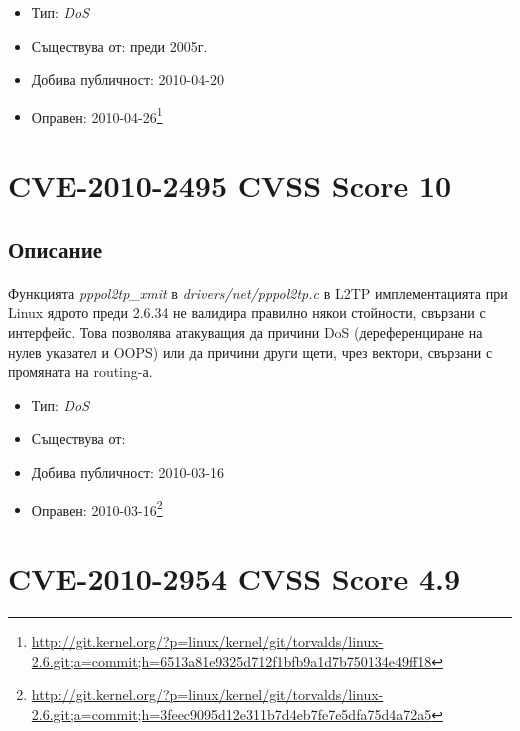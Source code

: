\documentclass[a4paper,12pt,leqno]{article}
\begin{document}
\begin{itemize}
    \item Тип: \textit{DoS}
    \item Съществува от: преди 2005г.
  	\item Добива публичност: 2010-04-20
    \item Оправен: 2010-04-26\footnote{\url{http://git.kernel.org/?p=linux/kernel/git/torvalds/linux-2.6.git;a=commit;h=6513a81e9325d712f1bfb9a1d7b750134e49ff18}}
\end{itemize}


\section{CVE-2010-2495 CVSS Score 10}
\subsection{Описание}
\paragraph{}

Функцията \textit{pppol2tp\_xmit} в \textit{drivers/net/pppol2tp.c} в L2TP имплементацията при Linux ядрото преди 2.6.34 не валидира правилно някои стойности, свързани с интерфейс. Това позволява атакуващия да причини DoS (дереференциране на нулев указател и OOPS) или да причини други щети, чрез вектори, свързани с промяната на routing-а.

\begin{itemize}
    \item Тип: \textit{DoS}
    \item Съществува от: 
  	\item Добива публичност: 2010-03-16
    \item Оправен: 2010-03-16\footnote{\url{http://git.kernel.org/?p=linux/kernel/git/torvalds/linux-2.6.git;a=commit;h=3feec9095d12e311b7d4eb7fe7e5dfa75d4a72a5}}
\end{itemize}

\section{CVE-2010-2954 CVSS Score 4.9}
\end{document}
